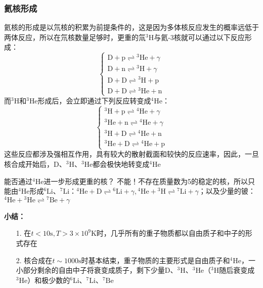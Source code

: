 \subsubsection{氦核形成}
\par 
氦核的形成是以氘核的积累为前提条件的，这是因为多体核反应发生的概率远低于两体反应，所以在氘核数量足够时，更重的氚${}^3\mathrm{H}$与氦-3核就可以通过以下反应形成：
$$
\begin{cases}
	\text{D} + \text{p} \rightleftharpoons {}^3\text{He} + \gamma \\
	\text{D} + \text{n} \rightleftharpoons {}^3\text{H} + \gamma \\
	\text{D} + \text{D} \rightleftharpoons {}^3\text{H} + \text{p} \\
	\text{D} + \text{D} \rightleftharpoons {}^3\text{He} + \text{n} 
\end{cases}
$$
而${}^3\text{H}$和${}^3\text{He}$形成后，会立即通过下列反应转变成${}^4\text{He}$：
$$
\begin{cases}
	{}^3\text{H} + \text{p} \rightleftharpoons {}^4\text{He} + \gamma \\
	{}^3\text{He} + \text{n} \rightleftharpoons {}^4\text{He} + \gamma \\
	{}^3\text{H} + \text{D} \rightleftharpoons {}^4\text{He} + \text{n} \\
	{}^3\text{He} + \text{D} \rightleftharpoons {}^4\text{He} + \text{p} 
\end{cases}
$$
这些反应都涉及强相互作用，具有较大的散射截面和较快的反应速率，因此，一旦核合成开始后，D、${}^3\text{H}$、${}^3\text{He}$都会极快地转变成${}^4\text{He}$
\begin{cbox}
	{能否通过${}^4\text{He}$进一步形成更重的核？}
	不能！不存在质量数为5的稳定的核，所以只能由${}^4\text{He}$形成${}^6\text{Li}$、${}^7\text{Li}$：${}^4\text{He} + \text{D} \rightleftharpoons {}^6\text{Li} + \gamma, {}^4\text{He} + {}^3\text{H} \rightleftharpoons {}^7\text{Li} + \gamma$；以及少量的铍：${}^4\text{He} + {}^3\text{He} \rightleftharpoons {}^7\text{Be} + \gamma$
\end{cbox}


\textbf{小结：}
\begin{itemize}
	\item[1. ] 在$t < 10 \mathrm{s}, T > 3 \times 10^9 \mathrm{K}$时，几乎所有的重子物质都以自由质子和中子的形式存在
	\item[2. ] 核合成在$t \sim 1000 \mathrm{s}$时基本结束，重子物质的主要形式是自由质子和${}^4\text{He}$，一小部分剩余的自由中子将衰变成质子，剩下少量D、${}^3\text{H}$、${}^3\text{He}$（${}^3\text{H}$随后衰变成	${}^3\text{He}$）和极少数的${}^6\text{Li}$、${}^7\text{Li}$、${}^7\text{Be}$
\end{itemize}



